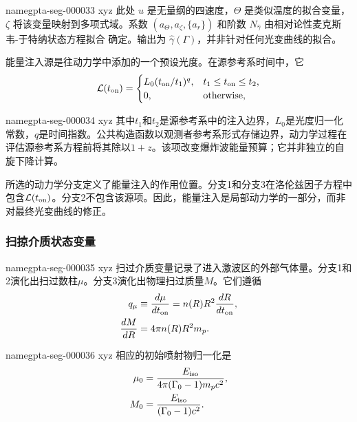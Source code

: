 \documentclass[twocolumn]{aastex702}
\makeatletter
\providecommand{\gptareaderanchor}[1]{\pdfdest name{#1} xyz}%
\providecommand{\gptareaderanchor}[1]{\special{pdf:dest (#1) [ @thispage /XYZ @xpos @ypos null ]}}%
\makeatother
\begin{document}
\gptareaderanchor{gpta-seg-000033}%
此处 \(u\) 是无量纲的四速度，\(\Theta\) 是类似温度的拟合变量，\(\zeta\) 将该变量映射到多项式域。系数 \((a_\Theta,a_\zeta,\{a_r\})\) 和阶数 \(N_{\hat\gamma}\) 由相对论性麦克斯韦-于特纳状态方程拟合 \citep{Service1986,Peer2012} 确定。输出为 \(\hat{\gamma}(\Gamma)\)，并非针对任何光变曲线的拟合。

能量注入源是往动力学中添加的一个预设光度。在源参考系时间中，它
\begin{equation}
\mathcal{L}(t_{\rm on})=
\begin{cases}
L_0(t_{\rm on}/t_1)^{q}, & t_1\le t_{\rm on}\le t_2,\\
0, & \text{otherwise},
\end{cases}
\end{equation}

\gptareaderanchor{gpta-seg-000034}%
其中\(t_1\)和\(t_2\)是源参考系中的注入边界，\(L_0\)是光度归一化常数，\(q\)是时间指数。公共构造函数以观测者参考系形式存储边界，动力学过程在评估源参考系方程前将其除以\(1+z\)。该项改变爆炸波能量预算；它并非独立的自旋下降计算。

所选的动力学分支定义了能量注入的作用位置。分支1和分支3在洛伦兹因子方程中包含\(\mathcal{L}(t_{\rm on})\)。分支2不包含该源项。因此，能量注入是局部动力学的一部分，而非对最终光变曲线的修正。

\subsubsection{扫掠介质状态变量}


\gptareaderanchor{gpta-seg-000035}%
扫过介质变量记录了进入激波区的外部气体量。分支1和2演化出扫过数柱\(\mu\)。分支3演化出物理扫过质量\(M\)。它们遵循
\begin{equation}
\begin{aligned}
q_\mu &\equiv\frac{d\mu}{dt_{\rm on}}
=n(R)R^2\frac{dR}{dt_{\rm on}},\\
\frac{dM}{dR} &=4\pi n(R)R^2m_p .
\end{aligned}
\end{equation}

\gptareaderanchor{gpta-seg-000036}%
相应的初始喷射物归一化是
\begin{equation}
\begin{aligned}
\mu_0 &=\frac{E_{\rm iso}}{4\pi(\Gamma_0-1)m_pc^2},\\
M_0 &=\frac{E_{\rm iso}}{(\Gamma_0-1)c^2}.
\end{aligned}
\end{equation}
\end{document}

